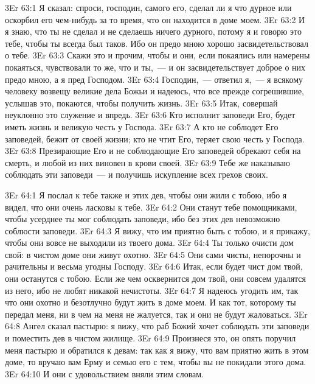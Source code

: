 \vs 3Er 63:1
Я сказал: спроси,
господин, самого его, сделал ли я что дурное или оскорбил его чем-нибудь за то
время, что он находится в доме моем.
\vs 3Er 63:2
И я знаю, что ты не сделал
и не сделаешь ничего дурного, потому я и говорю это тебе, чтобы ты всегда был
таков. Ибо он предо мною хорошо засвидетельствовал о тебе.
\vs 3Er 63:3
Скажи это и прочим, чтобы
и они, если покаялись или намерены покаяться, чувствовали то же, что и ты,~--- и
он засвидетельствует доброе о них предо мною, а я пред Господом.
\vs 3Er 63:4
Господин,~--- ответил я,~--- я
всякому человеку возвещу великие дела Божьи и надеюсь, что все прежде
согрешившие, услышав это, покаются, чтобы получить жизнь.
\vs 3Er 63:5
Итак, совершай неуклонно
это служение и впредь.
\vs 3Er 63:6
Кто исполнит заповеди Его,
будет иметь жизнь и великую честь у Господа.
\vs 3Er 63:7
А кто не соблюдет Его
заповедей, бежит от своей жизни; кто не чтит Его, теряет свою честь у Господа.
\vs 3Er 63:8
Презирающие Его и не
соблюдающие Его заповедей обрекают себя на смерть, и любой из них виновен в
крови своей.
\vs 3Er 63:9
Тебе же наказываю
соблюдать эти заповеди~--- и получишь искупление всех грехов своих.

\vs 3Er 64:1
Я послал к тебе также и
этих дев, чтобы они жили с тобою, ибо я видел, что они очень ласковы к тебе.
\vs 3Er 64:2
Они станут тебе
помощниками, чтобы усерднее ты мог соблюдать заповеди, ибо без этих дев
невозможно соблюсти заповеди.
\vs 3Er 64:3
Я вижу, что им приятно
быть с тобою, и я прикажу, чтобы они вовсе не выходили из твоего дома.
\vs 3Er 64:4
Ты только очисти дом свой:
в чистом доме они живут охотно.
\vs 3Er 64:5
Они сами чисты, непорочны
и рачительны и весьма угодны Господу.
\vs 3Er 64:6
Итак, если будет чист дом
твой, они останутся с тобою. Если же чем осквернится дом твой, они совсем
удалятся из него, ибо не любят никакой нечистоты.
\vs 3Er 64:7
Я надеюсь угодить им, так
что они охотно и безотлучно будут жить в доме моем. И как тот, которому ты
передал меня, ни в чем на меня не жалуется, так и они не будут жаловаться.
\vs 3Er 64:8
Ангел сказал пастырю: я
вижу, что раб Божий хочет соблюдать эти заповеди и поместить дев в чистом
жилище.
\vs 3Er 64:9
Произнеся это, он опять
поручил меня пастырю и обратился к девам: так как я вижу, что вам приятно жить
в этом доме, то вручаю вам Ерму и семью его с тем, чтобы вы не покидали этого
дома.
\vs 3Er 64:10
И они с удовольствием
вняли этим словам.

